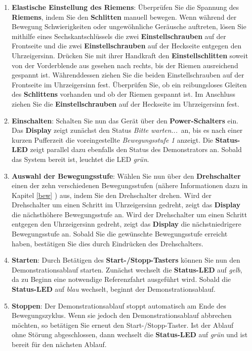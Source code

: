 \begin{enumerate} \label{STU}

	\item \textbf{Elastische Einstellung des Riemens}: Überprüfen Sie die Spannung des \textbf{Riemens}, indem Sie den \textbf{Schlitten} manuell bewegen. Wenn während der Bewegung Schwierigkeiten oder ungewöhnliche Geräusche auftreten, lösen Sie mithilfe eines Sechskantschlüssels die zwei \textbf{Einstellschrauben} auf der Frontseite und die zwei \textbf{Einstellschrauben} auf der Heckseite entgegen den Uhrzeigersinn. Drücken Sie mit ihrer Handkraft den \textbf{Einstellschlitten} soweit von der Vorderblende aus gesehen nach rechts, bis der Riemen ausreichend gespannt ist. Währenddessen ziehen Sie die beiden Einstellschrauben auf der Frontseite im Uhrzeigersinn fest. Überprüfen Sie, ob ein reibungsloses Gleiten des \textbf{Schlittens} vorhanden und ob der Riemen gespannt ist. Im Anschluss ziehen Sie die \textbf{Einstellschrauben} auf der Heckseite im Uhrzeigersinn fest. 
	
	\item \textbf{Einschalten}: Schalten Sie nun das Gerät über den \textbf{Power-Schalters} ein. Das \textbf{Display} zeigt zunächst den Status \glqq \textit{Bitte warten...}\grqq \ an, bis es nach einer kurzen Pufferzeit die voreingestellte \textit{\glqq Bewegungsstufe 1\grqq} anzeigt.
	Die \textbf{Status-LED} zeigt parallel dazu ebenfalls den Status des Demonstrators an. Sobald das System bereit ist, leuchtet die LED \textit{grün}.
	
	\item \textbf{Auswahl der Bewegungsstufe}: Wählen Sie nun über den \textbf{Drehschalter} einen der zehn verschiedenen Bewegungsstufen (nähere Informationen dazu in Kapitel \ref{bew} ) aus, indem Sie den Drehschalter drehen. Wird der Drehschalter um einen Schritt im Uhrzeigersinn gedreht, zeigt das \textbf{Display} die nächsthöhere Bewegungsstufe an. Wird der Drehschalter um einen Schritt entgegen den Uhrzeigersinn gedreht, zeigt das \textbf{Display} die nächstniedrigere Bewegungsstufe an. Sobald Sie die gewünschte Bewegungsstufe erreicht haben, bestätigen Sie dies durch Eindrücken des Drehschalters.	
	
	\item \textbf{Starten}: Durch Betätigen des \textbf{Start-/Stopp-Tasters} können Sie nun den Demonstrationsablauf starten. Zunächst wechselt die \textbf{Status-LED} auf \textit{gelb}, da zu Beginn eine notwendige Referenzfahrt ausgeführt wird. Sobald die \textbf{Status-LED} auf \textit{blau} wechselt, beginnt der Demonstrationsablauf.
	
	\item \textbf{Stoppen}: Der Demonstrationsablauf stoppt automatisch am Ende des Bewegungszyklus. Wenn sie jedoch den Demonstrationsablauf abbrechen möchten, so betätigen Sie erneut den Start-/Stopp-Taster. Ist der Ablauf ohne Störung abgeschlossen, dann wechselt die \textbf{Status-LED} auf \textit{grün} und ist bereit für den nächsten Ablauf.
\end{enumerate}
